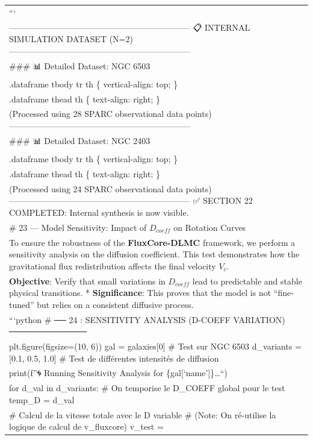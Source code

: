 \documentclass[
]{article}
\begin{document}
{\begin{longtable}[]{@{}
  >{\raggedright\arraybackslash}p{}@{}}
``` \\
----------------------------------------------------------------- 📋
INTERNAL SIMULATION DATASET (N=2)
----------------------------------------------------------------- \\
\#\#\# 📊 Detailed Dataset: NGC 6503 \\
 \\
.dataframe tbody tr th \{ vertical-align: top; \} \\
.dataframe thead th \{ text-align: right; \}  \\
(Processed using 28 SPARC observational data points)
----------------------------------------------------------------- \\
\#\#\# 📊 Detailed Dataset: NGC 2403 \\
 \\
.dataframe tbody tr th \{ vertical-align: top; \} \\
.dataframe thead th \{ text-align: right; \}  \\
(Processed using 24 SPARC observational data points)
----------------------------------------------------------------- ✅
SECTION 22 COMPLETED: Internal synthesis is now visible. \\
\# 23 --- Model Sensitivity: Impact of \(D_{coeff}\) on Rotation
Curves \\
To ensure the robustness of the \textbf{FluxCore-DLMC} framework, we
perform a sensitivity analysis on the diffusion coefficient. This test
demonstrates how the gravitational flux redistribution affects the final
velocity \(V_c\). \\
* \textbf{Objective}: Verify that small variations in \(D_{coeff}\) lead
to predictable and stable physical transitions. * \textbf{Significance}:
This proves that the model is not ``fine-tuned'' but relies on a
consistent diffusive process. \\
```python \# ── 24 : SENSITIVITY ANALYSIS (D-COEFF VARIATION)
───────────── \\
plt.figure(figsize=(10, 6)) gal = galaxies{[}0{]} \# Test sur NGC 6503
d\_variants = {[}0.1, 0.5, 1.0{]} \# Test de différentes intensités de
diffusion \\
print(f''🌀 Running Sensitivity Analysis for
\{gal{[}`name'{]}\}\ldots``) \\
for d\_val in d\_variants: \# On temporise le D\_COEFF global pour le
test temp\_D = d\_val \\
\# Calcul de la vitesse totale avec le D variable \# (Note: On
ré-utilise la logique de calcul de v\_fluxcore) v\_test =

\end{longtable}}
\end{document}
